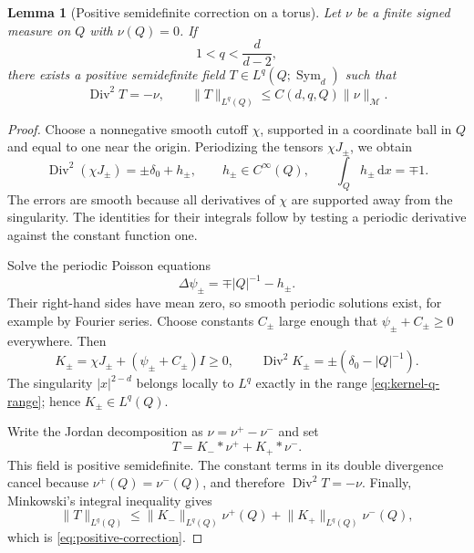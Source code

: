 \documentclass[11pt,a4paper,reqno]{amsart}
\theoremstyle{plain}
\newtheorem{lemma}[theorem]{Lemma}
\theoremstyle{remark}
\numberwithin{equation}{section}
\newcommand{\dd}{\,\mathrm d}
\newcommand{\norm}[1]{\lVert#1\rVert}
\newcommand{\TV}[1]{\norm{#1}_{\mathcal M}}
\DeclareMathOperator{\Div}{Div}
\DeclareMathOperator{\Sym}{Sym}
\begin{document}
\begin{lemma}[Positive semidefinite correction on a torus]\label{lem:positive-correction}
Let $\nu$ be a finite signed measure on $Q$ with $\nu(Q)=0$. If
\begin{equation}\label{eq:kernel-q-range}
 1<q<\frac d{d-2},
\end{equation}
there exists a positive semidefinite field $T\in L^q(Q;\Sym_d)$ such that
\begin{equation}\label{eq:positive-correction}
 \Div^2T=-\nu,\qquad
 \norm{T}_{L^q(Q)}\le C(d,q,Q)\TV{\nu}.
\end{equation}
\end{lemma}
\begin{proof}
Choose a nonnegative smooth cutoff $\chi$, supported in a coordinate ball in $Q$ and equal to one near the origin. Periodizing the tensors $\chi J_\pm$, we obtain
\[
 \Div^2(\chi J_\pm)=\pm\delta_0+h_\pm,
 \qquad h_\pm\in C^\infty(Q),\qquad \int_Qh_\pm\dd x=\mp1.
\]
The errors are smooth because all derivatives of $\chi$ are supported away from the singularity. The identities for their integrals follow by testing a periodic derivative against the constant function one.

Solve the periodic Poisson equations
\[
 \Delta\psi_\pm=\mp|Q|^{-1}-h_\pm.
\]
Their right-hand sides have mean zero, so smooth periodic solutions exist, for example by Fourier series. Choose constants $C_\pm$ large enough that $\psi_\pm+C_\pm\ge0$ everywhere. Then
\[
 K_\pm=\chi J_\pm+(\psi_\pm+C_\pm)I\ge0,
 \qquad
 \Div^2K_\pm=\pm(\delta_0-|Q|^{-1}).
\]
The singularity $|x|^{2-d}$ belongs locally to $L^q$ exactly in the range \eqref{eq:kernel-q-range}; hence $K_\pm\in L^q(Q)$.

Write the Jordan decomposition as $\nu=\nu^+-\nu^-$ and set
\[
 T=K_-*\nu^++K_+*\nu^-.
\]
This field is positive semidefinite. The constant terms in its double divergence cancel because $\nu^+(Q)=\nu^-(Q)$, and therefore $\Div^2T=-\nu$. Finally, Minkowski's integral inequality gives
\[
 \norm{T}_{L^q(Q)}
 \le \norm{K_-}_{L^q(Q)}\nu^+(Q)
       +\norm{K_+}_{L^q(Q)}\nu^-(Q),
\]
which is \eqref{eq:positive-correction}.
\end{proof}
\end{document}
